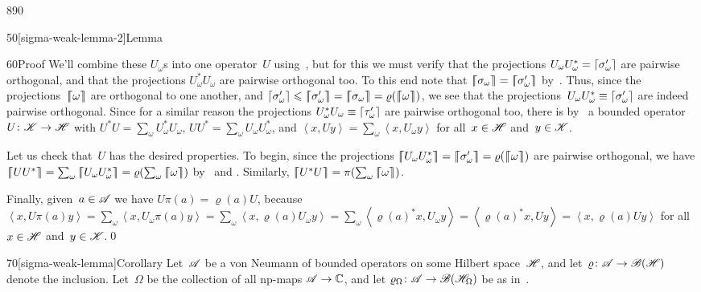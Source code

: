 \begin{parsec}{890}
\begin{point}{50}[sigma-weak-lemma-2]{Lemma}
\begin{point}{60}{Proof}
We'll combine these $U_\omega$s into one operator~$U$
using~, but for this we must
verify that the projections $U_\omega U_\omega^*=\left\lceil\sigma_\omega'\right\rceil$
are pairwise orthogonal,
and that the projections $U_\omega^* U_\omega$
are pairwise orthogonal too.
To this end note that
$\cceil{\sigma_\omega}=\cceil{\sigma_\omega'}$
by~.
Thus, since the projections~$\left\lceil\!\!\left\lceil\omega\right\rceil\!\!\right\rceil$
are orthogonal to one another,
and $\ceil{\sigma_\omega'}\leq \cceil{\sigma_\omega'}
= \cceil{\sigma_\omega} =\varrho(\cceil{\omega})$,
we see that the projections~$U_\omega U^*_\omega \equiv 
\left\lceil\sigma_\omega'\right\rceil$
are indeed pairwise orthogonal.
Since for a similar reason
the projections $U^*_\omega U_\omega
\equiv \left\lceil\tau_\omega'\right\rceil$ are pairwise orthogonal too,
there is by~
a bounded operator $U\colon \mathscr{K}\to\mathscr{H}$
with 
$U^*U = \sum_\omega U_\omega^* U_\omega$,
$UU^* = \sum_\omega U_\omega U_\omega^*$,
and $\left<x,Uy\right>=\sum_\omega \left<x,U_\omega y\right>$
for all~$x\in\mathscr{H}$ and~$y\in \mathscr{K}$.

Let us check that~$U$ has the desired properties.
To begin, since the projections
$\cceil{U_\omega U^*_\omega}=\cceil{\sigma_\omega'}=\varrho(\cceil{\omega})$
are pairwise orthogonal,
we have $\cceil{U U^*}=\sum_\omega \cceil{U_\omega U^*_\omega}
=  \varrho(\sum_\omega \cceil{\omega})$
by~ and
.
Similarly, $\cceil{U^*U}= \pi(\sum_\omega \cceil{\omega})$.

Finally,
given~$a\in\mathscr{A}$
we have $U\pi(a)=\varrho(a)U$,
because $\left<x,U\pi(a)y\right>
= \sum_\omega \left<x,U_\omega \pi(a)y\right>
= \sum_\omega \left<x,\varrho(a) U_\omega y\right>
= \sum_\omega \left<\varrho(a)^* x, U_\omega y\right>
= \left<\varrho(a)^* x, U y\right>
= \left<x, \varrho(a) U y\right>$
for all~$x\in\mathscr{H}$ and~$y\in\mathscr{K}$.\qed
\end{point}
\end{point}
\begin{point}{70}[sigma-weak-lemma]{Corollary}%
Let~$\mathscr{A}$ be a von Neumann 
of bounded operators on some Hilbert space~$\mathscr{H}$,
and let~$\varrho\colon \mathscr{A}\to\mathscr{B}(\mathscr{H})$
denote the inclusion.
Let~$\Omega$ be the collection of all np-maps $\mathscr{A}\to\mathbb{C}$,
and let $\varrho_\Omega\colon \mathscr{A}\to\mathscr{B}(\mathscr{H}_\Omega)$
be as in~.


\end{point}
\end{parsec}
